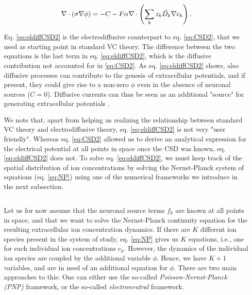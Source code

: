 \begin{equation}
\nabla \cdot (\sigma\nabla\phi) = - C - F\alpha \nabla \cdot \left (\sum_k{z_k \tilde{D_k}{\bf \nabla} c_{k}} \right).
\label{eq:eldiffCSD2}
\end{equation}

Eq. \ref{eq:eldiffCSD2} is the electrodiffusive counterpart to eq. \ref{eq:CSD2}, that we used as starting point in standard VC theory. The difference between the two equations is the last term in eq. \ref{eq:eldiffCSD2}, which is the diffusive contribution not accounted for in \ref{eq:CSD2}. As eq. \ref{eq:eldiffCSD2} shows, also diffusive processes can contribute to the genesis of extracellular potentials, and if present, they could give rise to a non-zero $\phi$ even in the absence of neuronal sources ($C = 0$). Diffusive currents can thus be seen as an additional "source" for generating extracellular potentials \cite{Halnes2017}. 

We note that, apart from helping us realizing the relationship between standard VC theory and electrodiffusive theory, eq. \ref{eq:eldiffCSD2} is not very "user friendly". Whereas eq. \ref{eq:CSD2} allowed us to derive an analytical expression for the electrical potential at all points in space once the CSD was known, eq. \ref{eq:eldiffCSD2} does not. To solve  eq. \ref{eq:eldiffCSD2}, we must keep track of the spatial distribution of ion concentrations by solving the Nernst-Planck system of equations (eq. \ref{eq:NP}) using one of the numerical frameworks we introduce in the next subsection.


\subsection{ }
Let us for now assume that the neuronal source terms $f_k$ are known at all points in space, and that we want to solve the Nernst-Planck continuity equation for the resulting extracellular ion concentration dynamics. If there are $K$ different ion species present in the system of study, eq. \ref{eq:NP} gives us $K$ equations, i.e., one for each individual ion concentrations $c_k$. However, the dynamics of the individual ion species are coupled by the additional variable $\phi$. Hence, we have $K+1$ variables, and are in need of an additional equation for $\phi$. There are two main approaches to this: One can either use the so-called \textit{Poisson-Nernst-Planck (PNP)} framework, or the so-called \textit{electroneutral} framework.

